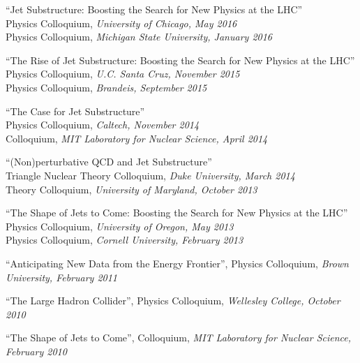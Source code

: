 \item ``Jet Substructure:  Boosting the Search for New Physics at the LHC''
\\ Physics Colloquium, \emph{University of Chicago, May 2016}
\\ Physics Colloquium, \emph{Michigan State University, January 2016}

\item ``The Rise of Jet Substructure:  Boosting the Search for New Physics at the LHC''
\\ Physics Colloquium, \emph{U.C. Santa Cruz, November 2015}
\\ Physics Colloquium, \emph{Brandeis, September 2015}

\item ``The Case for Jet Substructure''
\\ Physics Colloquium, \emph{Caltech, November 2014}
\\ Colloquium, \emph{MIT Laboratory for Nuclear Science, April 2014}

\item ``(Non)perturbative QCD and Jet Substructure''
\\ Triangle Nuclear Theory Colloquium, \emph{Duke University, March 2014}
\\ Theory Colloquium, \emph{University of Maryland, October 2013}

\item ``The Shape of Jets to Come:  Boosting the Search for New Physics at the LHC''
\\ Physics Colloquium, \emph{University of Oregon, May 2013}
\\ Physics Colloquium, \emph{Cornell University, February 2013}

\item ``Anticipating New Data from the Energy Frontier'', Physics Colloquium, \emph{Brown University, February 2011}

\item ``The Large Hadron Collider'', Physics Colloquium, \emph{Wellesley College, October 2010}

\item ``The Shape of Jets to Come'', Colloquium, \emph{MIT Laboratory for Nuclear Science, February 2010}

\el
